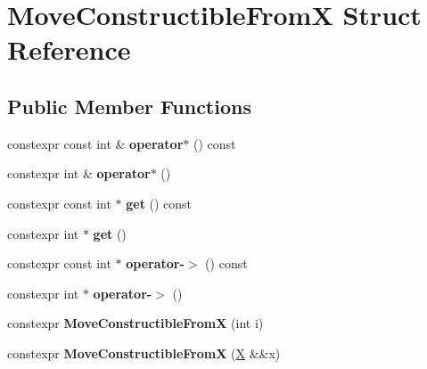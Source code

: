 \hypertarget{struct_move_constructible_from_x}{}\section{Move\+Constructible\+FromX Struct Reference}
\label{struct_move_constructible_from_x}
\subsection*{Public Member Functions}
\begin{DoxyCompactItemize}
\item 
\mbox{\label{struct_move_constructible_from_x_a04c83d14c02e0d2f76987613a4efb1a7}} 
constexpr const int \& {\bfseries operator$\ast$} () const
\item 
\mbox{\label{struct_move_constructible_from_x_a775a6088e48a0abc337921384908ec77}} 
constexpr int \& {\bfseries operator$\ast$} ()
\item 
\mbox{\label{struct_move_constructible_from_x_a1423adce6853fa2be349464a7c7c478d}} 
constexpr const int $\ast$ {\bfseries get} () const
\item 
\mbox{\label{struct_move_constructible_from_x_ae2b8fc226ac2ff95eb860224e5f3d7e3}} 
constexpr int $\ast$ {\bfseries get} ()
\item 
\mbox{\label{struct_move_constructible_from_x_a6402e8e0f8267342b9db9c7647d1b00f}} 
constexpr const int $\ast$ {\bfseries operator-\/$>$} () const
\item 
\mbox{\label{struct_move_constructible_from_x_a4bbd2a69ea57ddb97b87a3ed5e97a63b}} 
constexpr int $\ast$ {\bfseries operator-\/$>$} ()
\item 
\mbox{\label{struct_move_constructible_from_x_a5400b4d1d232d13dee50a4a755c8f256}} 
constexpr {\bfseries Move\+Constructible\+FromX} (int i)
\item 
\mbox{\label{struct_move_constructible_from_x_a11c2f02533de83426385d9f73d8d52c7}} 
constexpr {\bfseries Move\+Constructible\+FromX} (\mbox{\hyperlink{class_x}{X}} \&\&x)
\end{DoxyCompactItemize}
